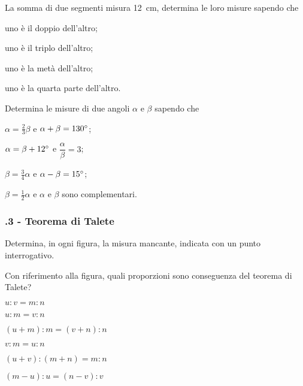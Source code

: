 \begin{multicols}{2}
\begin{esercizio}
\label{ese:6.29}
La somma di due segmenti misura 12~cm, determina le loro misure sapendo che
\begin{enumeratea}
\item uno è il doppio dell'altro;
\item uno è il triplo dell'altro;
\item uno è la metà dell'altro;
\item uno è la quarta parte dell'altro.
\end{enumeratea}
\end{esercizio}

\begin{esercizio}
\label{ese:6.30}
Determina le misure di due angoli $\alpha$ e $\beta$ sapendo che
\begin{enumeratea}
\item $\alpha = \frac{2}{3}\beta$ e $\alpha+\beta=130{}^{\circ}$;
\item $\alpha = \beta + 12{}^{\circ}$ e $\dfrac{\alpha}{\beta}=3$;
\item $\beta = \frac{3}{4}\alpha$ e $\alpha-\beta=15{}^{\circ}$;
\item $\beta=\frac{1}{2}\alpha$ e $\alpha$ e $\beta$ sono complementari.
\end{enumeratea}
\end{esercizio}

\subsubsection*{\thechapter.3 - Teorema di Talete}

\begin{esercizio}
\label{ese:6.31}
Determina, in ogni figura, la misura mancante, indicata con un punto interrogativo.
\end{esercizio}

\begin{esercizio}
\label{ese:6.32}
Con riferimento alla figura, quali proporzioni sono conseguenza del teorema di Talete?
\begin{enumeratea}
\item $u : v = m : n$
\item $u : m = v : n$
\item $(u+m) : m = (v+n) : n$
\item $v : m = u : n$
\item $(u + v) : (m + n) = m : n$
\item $(m-u) : u = (n-v) : v$
\end{enumeratea}
\end{esercizio}


\end{multicols}
